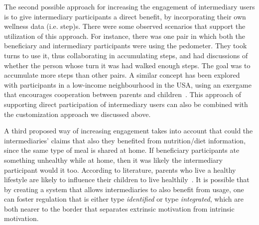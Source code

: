 The second possible approach for increasing the engagement of intermediary users is to give intermediary participants a direct benefit, by incorporating their own wellness data (i.e. step)s. There were some observed scenarios that support the utilization of this approach. For instance, there was one pair in which both the beneficiary and intermediary participants were using the pedometer. They took turns to use it, thus collaborating in accumulating steps, and had discussions of whether the person whose turn it was had walked enough steps. The goal was to accumulate more steps than other pairs. A similar concept has been explored with participants in a low-income neighbourhood in the USA, using an exergame that encourages cooperation between parents and children~\citep{saksono2015spaceship}. This approach of supporting direct participation of intermediary users can also be combined with the customization approach we discussed above.

A third proposed way of increasing engagement takes into account that could the intermediaries' claims that also they benefited from nutrition/diet information, since the same type of meal is shared at home. If beneficiary participants ate something unhealthy while at home, then it was likely the intermediary participant would it too. According to literature, parents who live a healthy lifestyle are likely to influence their children to live healthily~\citep{grimes2009toward}. It is possible that by creating a system that allows intermediaries to also benefit from usage, one can foster regulation that is either type \emph{identified} or type \emph{integrated}, which are both nearer to the border that separates extrinsic motivation from intrinsic motivation. 

